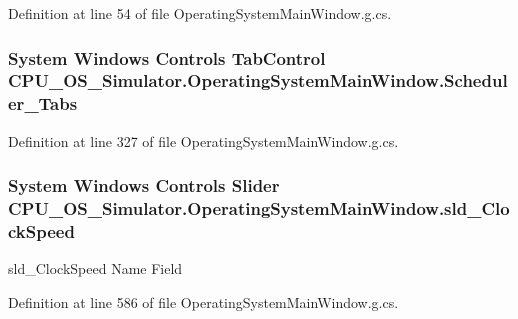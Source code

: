 Definition at line 54 of file Operating\+System\+Main\+Window.\+g.\+cs.

\hypertarget{class_c_p_u___o_s___simulator_1_1_operating_system_main_window_a2575de899df7277ae9c310931b8dbaa0}{}
\subsubsection[{Scheduler\+\_\+\+Tabs}]{\setlength{\rightskip}{0pt plus 5cm}System Windows Controls Tab\+Control C\+P\+U\+\_\+\+O\+S\+\_\+\+Simulator.\+Operating\+System\+Main\+Window.\+Scheduler\+\_\+\+Tabs\hspace{0.3cm}{\ttfamily [package]}}\label{class_c_p_u___o_s___simulator_1_1_operating_system_main_window_a2575de899df7277ae9c310931b8dbaa0}


Definition at line 327 of file Operating\+System\+Main\+Window.\+g.\+cs.

\hypertarget{class_c_p_u___o_s___simulator_1_1_operating_system_main_window_a21bd388b7e1e821db2bfcee90530c3ae}{}
\subsubsection[{sld\+\_\+\+Clock\+Speed}]{\setlength{\rightskip}{0pt plus 5cm}System Windows Controls Slider C\+P\+U\+\_\+\+O\+S\+\_\+\+Simulator.\+Operating\+System\+Main\+Window.\+sld\+\_\+\+Clock\+Speed}\label{class_c_p_u___o_s___simulator_1_1_operating_system_main_window_a21bd388b7e1e821db2bfcee90530c3ae}


sld\+\_\+\+Clock\+Speed Name Field 



Definition at line 586 of file Operating\+System\+Main\+Window.\+g.\+cs.

